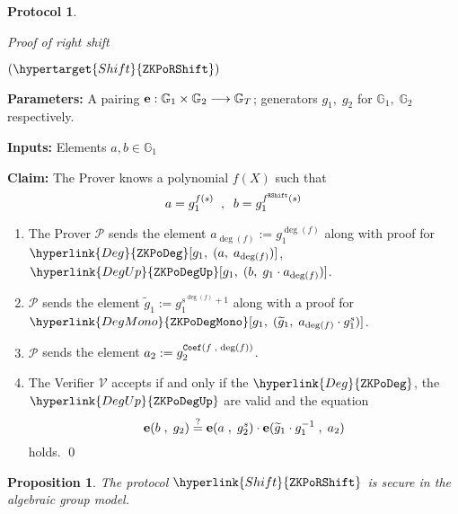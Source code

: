 \documentclass[11pt, lettersize, notitlepage, leqno, footskip=0.6cm]{article}
\newcommand{\lra}{\longrightarrow}
\newcommand{\wti}{\widetilde}
\newcommand{\mc}{\mathcal}
\newcommand{\mb}{\mathbb}
\newcommand{\mbf}{\mathbf}
\newcommand{\mP}{\mc{P}}
\newcommand{\V}{\mc{V}}
\newcommand{\vs}{\vspace{-0.15cm}}
\newcommand{\noin}{\noindent}
\newcommand{\sta}{\stackrel{?}{=}}
\newcommand{\e}{\mbf{e}}
\newtheorem{Prop}[Thm]{Proposition}
\newtheorem{Prot}[Thm]{Protocol}
\numberwithin{equation}{section}
\begin{document}
\begin{mdframed}
\begin{Prot} \hypertarget{Shift}{Proof of right shift} $(\hypertarget{Shift}{\tt{ZKPoRShift}})$ \end{Prot}  

\noin \textbf{Parameters:} A pairing ${\bf{e}}:\mb{G}_1\times \mb{G}_2\lra \mb{G}_T$; generators $g_1,\;g_2$ for $\mb{G}_1,\; \mb{G}_2$ respectively. 


\noin \textbf{Inputs:} Elements $a, b \in \mb{G}_1$

\noin \textbf{Claim:} The Prover knows a polynomial $f(X)$ such that \vs $$ a = g_1^{f(s)}\;\;,\;\;b = g_1^{f^{\tt{RShift}}(s)} $$

\begin{enumerate}[wide, labelwidth=!, labelindent=0pt, itemsep=-0.2ex] 

\item The Prover $\mP$ sends the element $a_{\deg(f)}:= g_1^{\deg(f)}$ along with proof for\\ $\hyperlink{Deg}{\tt{ZKPoDeg}}[g_1,\;(a,\;a_{\deg(f)})]$, $\hyperlink{DegUp}{\tt{ZKPoDegUp}}[g_1,\;(b,\;g_1\cdot a_{\deg(f)})]$.

\item $\mP$ sends the element $\wti{g}_1:= g_1^{s^{\deg(f)}+1}$ along with a proof for\\ $\hyperlink{DegMono}{\tt{ZKPoDegMono}}[g_1,\;(\wti{g}_1,\;a_{\deg(f)}\cdot g_1^{s})]$.

\item $\mP$ sends the element $a_2:= g_2^{{\tt{Coef}}(f\;,\;\deg(f))}$.

\item The Verifier $\V$ accepts if and only if the $\hyperlink{Deg}{\tt{ZKPoDeg}}$, the $\hyperlink{DegUp}{\tt{ZKPoDegUp}}$ are valid and the equation $$ \e(b\;,\;g_2)\sta \e(a\;,\;g_2^s)\cdot \e(\wti{g}_1\cdot g_1^{-1}\;,\;a_2) \vs $$ holds.  \qed \end{enumerate} \end{mdframed} 


\bigskip


\begin{Prop} The protocol $\hyperlink{Shift}{\tt{ZKPoRShift}}$ is secure in the algebraic group model.\end{Prop}
\end{document}
